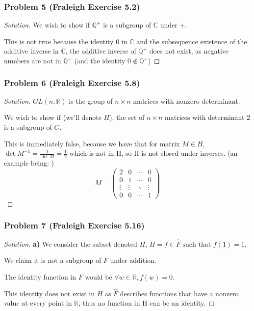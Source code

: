 \documentclass[11pt]{article}
\newcommand{\1}{\mathbf{1}}
\theoremstyle{definition}
\newenvironment{solution}{\begin{proof}[Solution]}{\end{proof}}
\begin{document}
\subsubsection*{Problem 5 (Fraleigh Exercise 5.2)}
\begin{solution}
We wish to show if $\mathbb{Q}^{+}$ is a subgroup of $\mathbb{C}$ under $+.$
\par This is not true because the identity $0$ in $\mathbb{C}$ and the subsequence existence of the additive inverse in $\mathbb{C}$, the
additive inverse of $\mathbb{Q}^{+}$ does not exist, as negative numbers are not in
$\mathbb{Q}^{+}$ (and the identity $0 \not \in \mathbb{Q}^{+}$)
\end{solution}
\subsubsection*{Problem 6 (Fraleigh Exercise 5.8)}
\begin{solution}
    $GL(n, \mathbb{R})$ is the group of $n \times n$ matrices with nonzero determinant.
\par    We wish to show if (we'll denote $H$), the set of $n \times n$ matrices with
    determinant 2 is a subgroup of $G$.
   \par  This is immediately false, because we have that for matrix $M \in H$,
    $\det M^{-1} = \frac{1}{\det M} = \frac{1}{2}$ which is not in H, so H is not closed
    under inverses. (an example being: )
    \[M =
\begin{pmatrix}
2 & 0 & \cdots & 0 \\
0 & 1 & \cdots & 0 \\
\vdots & \vdots & \ddots & \vdots \\
0 & 0 & \cdots & 1
\end{pmatrix}
\]
\end{solution}

\subsubsection*{Problem 7 (Fraleigh Exercise 5.16)}
\begin{solution}
    \textbf{ a) }We consider the subset denoted $H$,  $H  = f \in \hat {F} \text{ such
    that } f(1) = 1.$
    \par We claim it is  $\text{not}$ a subgroup of $F$ under addition.
\par     The identity function in $F$ would be $\forall w \in \mathbb{R}, f(w) = 0.$

\par     This identity does not exist in $H$ as $\hat{F}$ describes functions that have a
    nonzero value at every point in $\mathbb{R}$, thus no  function in H can be an identity.
\end{solution}
\end{document}
